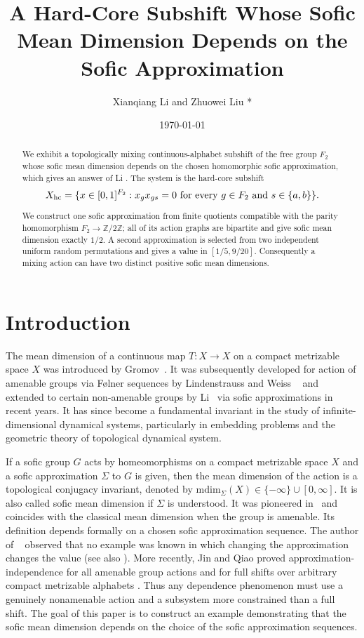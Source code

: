 \documentclass[12pt,a4paper]{amsart}
\title{A Hard-Core Subshift Whose Sofic Mean Dimension Depends on the Sofic Approximation}
\author{Xianqiang Li and Zhuowei Liu *}
\date{\today}
\theoremstyle{definition}
\newcommand{\Z}{\mathbb Z}
\begin{document}
	\maketitle
	
	\begin{abstract}
  		We exhibit a topologically mixing continuous-alphabet subshift of the free group $F_2$ whose sofic mean dimension depends on the chosen homomorphic sofic approximation, which gives an answer of Li \cite[Remark 2.7]{Li13}.  The system is the hard-core subshift
		\[
		X_{\rm hc}=\{x\in [0,1]^{F_2}:x_gx_{gs}=0\text{ for every }g\in F_2\text{ and }s\in\{a,b\}\}.
		\]
		
		We construct one sofic approximation from finite quotients compatible with the parity homomorphism $F_2\to\Z/2\Z$; all of its action graphs are bipartite and give sofic mean dimension exactly $1/2$.  A second approximation is selected from two independent uniform random permutations and gives a value in $[1/5,9/20]$.  Consequently a mixing action can have two distinct positive sofic mean dimensions.
	\end{abstract}
	
	\section{Introduction}
	The mean dimension of a continuous map $T : X \to X$ on a compact metrizable space $X$ was introduced by Gromov~\cite{MG}. 
It was subsequently developed for action of amenable groups via F\o lner sequences by Lindenstrauss and
Weiss ~\cite{LW00} and extended to certain non-amenable groups by Li~\cite{Li13} via sofic approximations in recent years. 
It has since become a fundamental invariant in the study of infinite-dimensional dynamical systems, particularly in embedding problems and the geometric theory of topological dynamical system. 

If a sofic group $G$ acts by homeomorphisms on a compact metrizable space $X$ and a sofic approximation $\Sigma$ to $G$ is given, then the mean dimension of the action is a topological conjugacy invariant, denoted by $\mathrm{mdim}_\Sigma(X) \in \{-\infty\}\cup[0, \infty]$.
It is also called sofic mean dimension if $\Sigma$ is understood.
It was pioneered in~\cite{Li13} and coincides with the classical mean dimension when the group is amenable. Its definition depends formally on a chosen sofic approximation sequence.  The author of ~\cite{Li13} observed that no example was known in which changing the approximation changes the value (see also \cite[Remark 2.21]{GRFYG}).  More recently, Jin and Qiao proved approximation-independence for all amenable group actions and for full shifts over arbitrary compact metrizable alphabets \cite{JQ24}.  Thus any dependence phenomenon must use a genuinely nonamenable action and a subsystem more constrained than a full shift. The goal of this paper is to construct an example demonstrating that the sofic mean dimension depends on the choice of the sofic approximation sequences.
	
\end{document}
